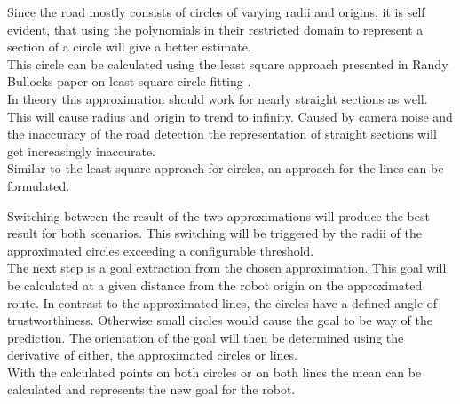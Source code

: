 Since the road mostly consists of circles of varying radii and origins, it is self evident, that using the polynomials in their restricted domain to represent a section of a circle will give a better estimate.\\
This circle can be calculated using the least square approach presented in Randy Bullocks paper on least square circle fitting \cite{leastsquarecircle}.\\

In theory this approximation should work for nearly straight sections as well. This will cause radius and origin to trend to infinity. Caused by camera noise and the inaccuracy of the road detection the representation of straight sections will get increasingly inaccurate.\\

Similar to the least square approach for circles, an approach for the lines can be formulated.

Switching between the result of the two approximations will produce the best result for both scenarios. This switching will be triggered by the radii of the approximated circles exceeding a configurable threshold.\\

The next step is a goal extraction from the chosen approximation. This goal will be calculated at a given distance from the robot origin on the approximated route. In contrast to the approximated lines, the circles have a defined angle of trustworthiness. Otherwise small circles would cause the goal to be way of the prediction. The orientation of the goal will then be determined using the derivative of either, the approximated circles or lines.\\

With the calculated points on both circles or on both lines the mean can be calculated and represents the new goal for the robot.

